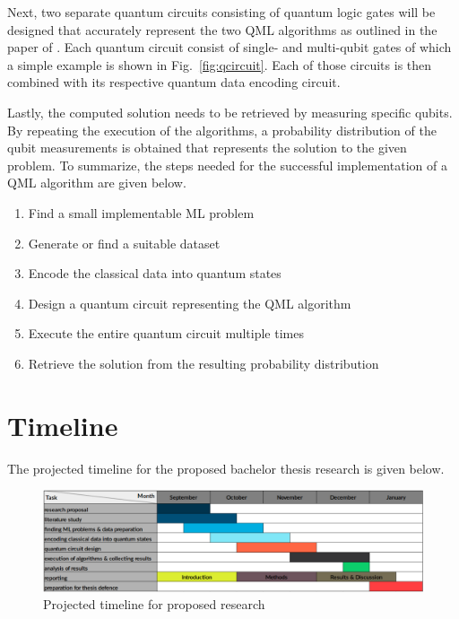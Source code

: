 \documentclass[a4paper]{article}
\newcommand*{\0}{$\ket{0}$}
\newcommand*{\1}{$\ket{1}$}
\begin{document}

Next, two separate quantum circuits consisting of quantum logic gates will be designed that accurately represent the two QML algorithms as outlined in the paper of \cite{Schuld2014, Schuld2016}. Each quantum circuit consist of single- and multi-qubit gates of which a simple example is shown in Fig.~\ref{fig:qcircuit}. Each of those circuits is then combined with its respective quantum data encoding circuit.

Lastly, the computed solution needs to be retrieved by measuring specific qubits. By repeating the execution of the algorithms, a probability distribution of the qubit measurements is obtained that represents the solution to the given problem.
\newpage
To summarize, the steps needed for the successful implementation of a QML algorithm are given below.

\begin{enumerate}
\item Find a small implementable ML problem
\item Generate or find a suitable dataset
\item Encode the classical data into quantum states
\item Design a quantum circuit representing the QML algorithm
\item Execute the entire quantum circuit multiple times
\item Retrieve the solution from the resulting probability distribution
\end{enumerate}

\section{Timeline}
\label{sec:timeline}

The projected timeline for the proposed bachelor thesis research is given below.

\begin{figure}[!ht]
\centering
\includegraphics[scale=0.385]{ready_timeline.png}
\caption{Projected timeline for proposed research}
\end{figure}
\end{document}
